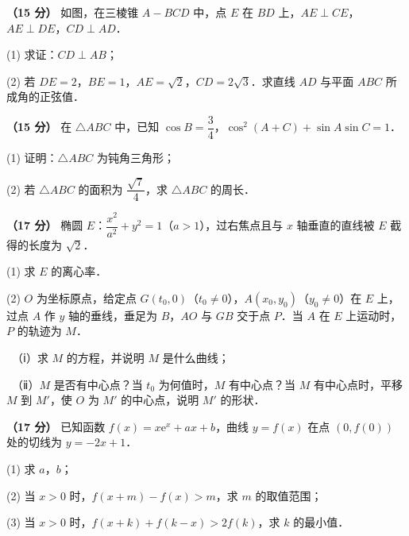 \textbf{（15 分）} 如图，在三棱锥 $A-BCD$ 中，点 $E$ 在 $BD$ 上，$AE\perp CE$，$AE\perp DE$，$CD\perp AD$．

\begin{center}\end{center}

  (1) 求证：$CD\perp AB$；

  (2) 若 $DE=2$，$BE=1$，$AE=\sqrt{2}$，$CD=2\sqrt{3}$．求直线 $AD$ 与平面 $ABC$ 所成角的正弦值．

\textbf{（15 分）} 在 $\triangle ABC$ 中，已知 $\cos B=\dfrac{3}{4}$，$\cos^2(A+C)+\sin A\sin C=1$．

  (1) 证明：$\triangle ABC$ 为钝角三角形；

  (2) 若 $\triangle ABC$ 的面积为 $\dfrac{\sqrt{7}}{4}$，求 $\triangle ABC$ 的周长．

\textbf{（17 分）} 椭圆 $E$：$\dfrac{x^2}{a^2}+y^2=1$（$a>1$），过右焦点且与 $x$ 轴垂直的直线被 $E$ 截得的长度为 $\sqrt{2}$．

  (1) 求 $E$ 的离心率．

  (2) $O$ 为坐标原点，给定点 $G(t_0,0)$（$t_0\ne0$），$A(x_0,y_0)$（$y_0\ne0$）在 $E$ 上，过点 $A$ 作 $y$ 轴的垂线，垂足为 $B$，$AO$ 与 $GB$ 交于点 $P$．当 $A$ 在 $E$ 上运动时，$P$ 的轨迹为 $M$．

  　（ⅰ）求 $M$ 的方程，并说明 $M$ 是什么曲线；

  　（ⅱ）$M$ 是否有中心点？当 $t_0$ 为何值时，$M$ 有中心点？当 $M$ 有中心点时，平移 $M$ 到 $M'$，使 $O$ 为 $M'$ 的中心点，说明 $M'$ 的形状．

\textbf{（17 分）} 已知函数 $f(x)=x\mathrm{e}^x+ax+b$，曲线 $y=f(x)$ 在点 $\left(0,f(0)\right)$ 处的切线为 $y=-2x+1$．

  (1) 求 $a$，$b$；

  (2) 当 $x>0$ 时，$f(x+m)-f(x)>m$，求 $m$ 的取值范围；

  (3) 当 $x>0$ 时，$f(x+k)+f(k-x)>2f(k)$，求 $k$ 的最小值．

\par\medskip

